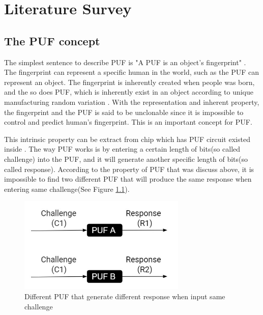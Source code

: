 \chapter{Literature Survey}

\section{The PUF concept}
The simplest sentence to describe PUF is "A PUF is an object's fingerprint" \cite{Reference4}. The fingerprint can represent a specific human in the world, such as the PUF can represent
an object. The fingerprint is inherently created when people was born, and the so does PUF, which is inherently exist in an object according to unique manufacturing random variation \cite{Reference4}.
With the representation and inherent property, the fingerprint and the PUF is said to be unclonable since it is impossible to control and predict human's fingerprint. This is an important concept for PUF. \par

This intrinsic property can be extract from chip which has PUF circuit existed inside \cite{Reference2}. The way PUF works is by entering a certain length of bits(so called challenge) into the PUF, and it will
generate another specific length of bits(so called response). According to the property of PUF that was discuss above, it is impossible to find two different PUF that will produce the same response when entering same challenge(See Figure \ref{fig:figure1}).
\begin{figure}[ht]
\centering
\includegraphics[width=8cm]{figures/figure1.jpg}
\caption{Different PUF that generate different response when input same challenge}
\label{fig:figure1}
\end{figure}

